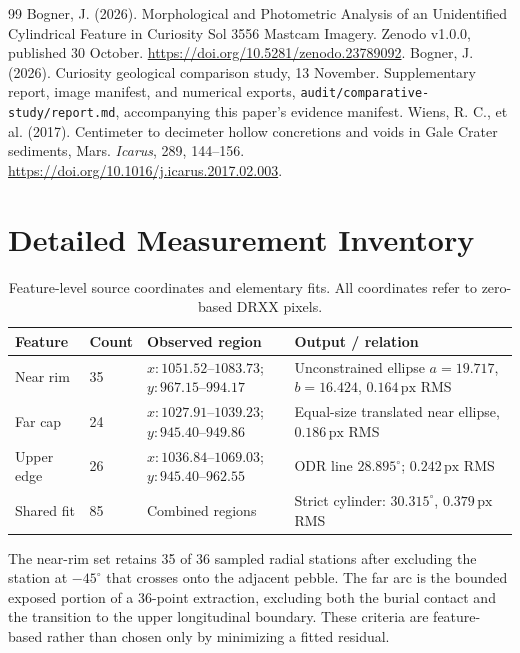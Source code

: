 \documentclass[11pt,letterpaper]{article}
\newcommand{\px}{\,\mathrm{px}}
\newcommand{\sourcepath}[1]{\nolinkurl{#1}}
\begin{document}
\begin{thebibliography}{99}
 Bogner, J. (2026). Morphological and Photometric Analysis of an Unidentified Cylindrical Feature in Curiosity Sol 3556 Mastcam Imagery. Zenodo v1.0.0, published 30 October. \url{https://doi.org/10.5281/zenodo.23789092}.
 Bogner, J. (2026). Curiosity geological comparison study, 13 November. Supplementary report, image manifest, and numerical exports, \sourcepath{audit/comparative-study/report.md}, accompanying this paper's evidence manifest.
 Wiens, R. C., et al. (2017). Centimeter to decimeter hollow concretions and voids in Gale Crater sediments, Mars. \emph{Icarus}, 289, 144--156. \url{https://doi.org/10.1016/j.icarus.2017.02.003}.
\end{thebibliography}

\appendix
\section{Detailed Measurement Inventory}
\label{app:inventory}

\begin{table}[ht]
\centering\small
\caption{Feature-level source coordinates and elementary fits. All coordinates refer to zero-based DRXX pixels.}
\begin{tabularx}{\linewidth}{@{}l l l X@{}}
\toprule
\textbf{Feature} & \textbf{Count} & \textbf{Observed region} & \textbf{Output / relation} \\
\midrule
Near rim & 35 & \(x:1051.52\)--\(1083.73\); \(y:967.15\)--\(994.17\) & Unconstrained ellipse \(a=19.717\), \(b=16.424\), \(0.164\px\) RMS \\
Far cap & 24 & \(x:1027.91\)--\(1039.23\); \(y:945.40\)--\(949.86\) & Equal-size translated near ellipse, \(0.186\px\) RMS \\
Upper edge & 26 & \(x:1036.84\)--\(1069.03\); \(y:945.40\)--\(962.55\) & ODR line \(28.895^\circ\); \(0.242\px\) RMS \\
Shared fit & 85 & Combined regions & Strict cylinder: \(30.315^\circ\), \(0.379\px\) RMS \\
\bottomrule
\end{tabularx}
\end{table}

The near-rim set retains 35 of 36 sampled radial stations after excluding the station at \(-45^\circ\) that crosses onto the adjacent pebble. The far arc is the bounded exposed portion of a 36-point extraction, excluding both the burial contact and the transition to the upper longitudinal boundary. These criteria are feature-based rather than chosen only by minimizing a fitted residual.
\end{document}

